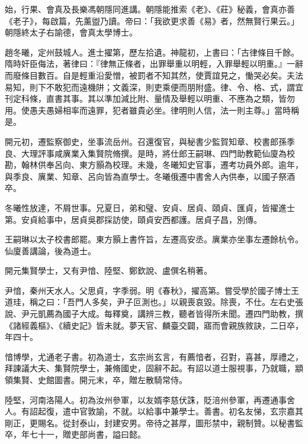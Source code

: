 \begin{pinyinscope}
 始，行果、會真及長樂馮朝隱同進講。朝隱能推索《老》、《莊》秘義，會真亦善《老子》，每啟篇，先薰盥乃讀。帝曰：「我欲更求善《易》者，然無賢行果云。」朝隱終太子右諭德，會真太學博士。



 趙冬曦，定州鼓城人。進士擢第，歷左拾遺。神龍初，上書曰：「古律條目千餘。隋時奸臣侮法，著律曰：『律無正條者，出罪舉重以明輕，入罪舉輕以明重。』一辭而廢條目數百。自是輕重沿愛憎，被罰者不知其然，使賈誼見之，慟哭必矣。夫法易知，則下不敢犯而遠機阱；文義深，則吏乘便而朋附盛。律、令、格、式，謂宜刊定科條，直書其事。其以準加減比附、量情及舉輕以明重、不應為之類，皆勿用。使愚夫愚婦相率而遠罪，犯者雖貴必坐。律明則人信，法一則主尊。」當時稱是。



 開元初，遷監察御史，坐事流岳州。召還復官，與秘書少監賀知章、校書郎孫季良、大理評事咸廙業入集賢院脩撰。是時，將仕郎王嗣琳、四門助教範仙廈為校勘，翰林供奉呂向、東方顥為校理。未幾，冬曦知史官事，遷考功員外郎。逾年，與季良、廙業、知章、呂向皆為直學士。冬曦俄遷中書舍人內供奉，以國子祭酒卒。



 冬曦性放達，不屑世事。兄夏日，弟和璧、安貞、居貞、頤貞、匯貞，皆擢進士第。安貞給事中，居貞吳郡採訪使，頤貞安西都護。居貞子昌，別傳。



 王嗣琳以太子校書郎罷。東方顥上書忤旨，左遷高安丞。廙業亦坐事左遷餘杭令。仙廈善講論，後為道士。



 開元集賢學士，又有尹愔、陸堅、鄭欽說、盧僎名稍著。



 尹愔，秦州天水人。父思貞，字季弱。明《春秋》，擢高第。嘗受學於國子博士王道珪，稱之曰：「吾門人多矣，尹子叵測也。」以親喪哀毀。除喪，不仕。左右史張說、尹元凱薦為國子大成。每釋奠，講辨三教，聽者皆得所未聞。遷四門助教，撰《諸經義樞》、《續史記》皆未就。夢天官、麟臺交闢，寤而會親族敘訣，二日卒，年四十。



 愔博學，尤通老子書。初為道士，玄宗尚玄言，有薦愔者，召對，喜甚，厚禮之，拜諫議大夫、集賢院學士，兼脩國史，固辭不起。有詔以道士服視事，乃就職，顓領集賢、史館圖書。開元末，卒，贈左散騎常侍。



 陸堅，河南洛陽人。初為汝州參軍，以友婿李慈伏誅，貶涪州參軍，再遷通事舍人。有詔起復，遣中官敦諭，不就。以給事中兼學士。善書。初名友悌，玄宗嘉其剛正，更賜名。從封泰山，封建安男。帝待之甚厚，圖形禁中，親制贊。以秘書監卒，年七十一，贈吏部尚書，謚曰懿。




\end{pinyinscope}
